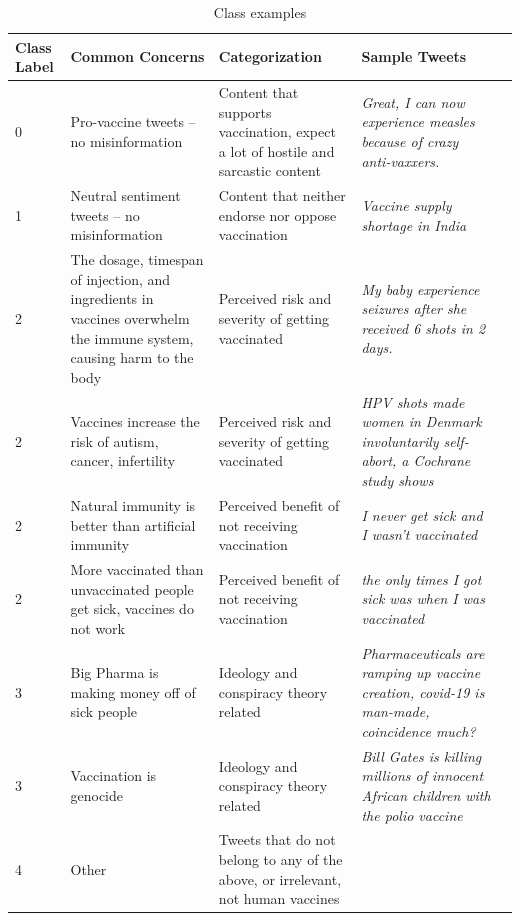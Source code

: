 \documentclass[12pt]{article}
\begin{document}
\begin{table}[tbp]
\centering
\begin{tabularx}{\linewidth}{ l X X X X}
\toprule
    Class Label & Common Concerns &Categorization & Sample Tweets\\
\midrule

0 &	Pro-vaccine tweets – no misinformation &	Content that supports vaccination, expect a lot of hostile and sarcastic content & \textit{Great, I can now experience measles because of crazy anti-vaxxers.} \\
\midrule

1 & Neutral sentiment tweets – no misinformation & Content that neither endorse nor oppose vaccination &  \textit{Vaccine supply shortage in India}  \\
\midrule

2 & The dosage, timespan of injection, and ingredients in vaccines overwhelm the immune system, causing harm to the body & Perceived risk and severity of getting vaccinated & \textit{My baby experience seizures after she received 6 shots in 2 days.} \\
\midrule
2&Vaccines increase the risk of autism, cancer, infertility &Perceived risk and severity of getting vaccinated & \textit{HPV shots made women in Denmark involuntarily self-abort, a Cochrane study shows}\\
\midrule
2&Natural immunity is better than artificial immunity&Perceived benefit of not receiving vaccination &\textit{I never get sick and I wasn't vaccinated}\\
\midrule
2&More vaccinated than unvaccinated people get sick, vaccines do not work&Perceived benefit of not receiving vaccination & \textit{the only times I got sick was when I was vaccinated}\\
\midrule

3&Big Pharma is making money off of sick people &Ideology and conspiracy theory related & \textit{Pharmaceuticals are ramping up vaccine creation, covid-19 is man-made, coincidence much?}\\
\midrule
3&Vaccination is genocide&Ideology and conspiracy theory related &\textit{Bill Gates is killing millions of innocent African children with the polio vaccine}\\
\midrule
4&Other& Tweets that do not belong to any of the above, or irrelevant, not human vaccines& \textit{}\\

\bottomrule
\end{tabularx}
\caption{Class examples}
\label{tbl:class_examples}
\end{table}
\end{document}
